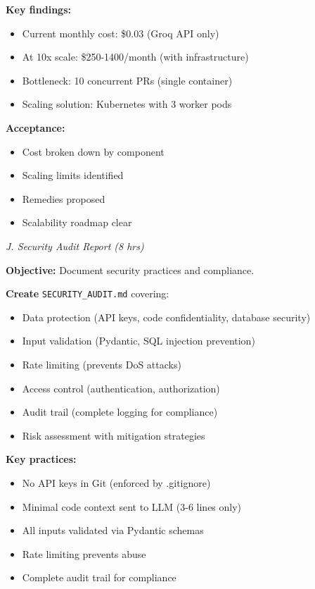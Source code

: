 \documentclass[11pt,a4paper]{article}
\begin{document}
\textbf{Key findings:}
\begin{itemize}[leftmargin=*]
    \item Current monthly cost: \$0.03 (Groq API only)
    \item At 10x scale: \$250-1400/month (with infrastructure)
    \item Bottleneck: 10 concurrent PRs (single container)
    \item Scaling solution: Kubernetes with 3 worker pods
\end{itemize}

\textbf{Acceptance:}
\begin{itemize}[leftmargin=*]
    \item[$\checkmark$] Cost broken down by component
    \item[$\checkmark$] Scaling limits identified
    \item[$\checkmark$] Remedies proposed
    \item[$\checkmark$] Scalability roadmap clear
\end{itemize}

\textit{J. Security Audit Report (8 hrs)}

\textbf{Objective:} Document security practices and compliance.

\textbf{Create} \texttt{SECURITY\_AUDIT.md} covering:
\begin{itemize}[leftmargin=*]
    \item Data protection (API keys, code confidentiality, database security)
    \item Input validation (Pydantic, SQL injection prevention)
    \item Rate limiting (prevents DoS attacks)
    \item Access control (authentication, authorization)
    \item Audit trail (complete logging for compliance)
    \item Risk assessment with mitigation strategies
\end{itemize}

\textbf{Key practices:}
\begin{itemize}[leftmargin=*]
    \item No API keys in Git (enforced by .gitignore)
    \item Minimal code context sent to LLM (3-6 lines only)
    \item All inputs validated via Pydantic schemas
    \item Rate limiting prevents abuse
    \item Complete audit trail for compliance
\end{itemize}
\end{document}
